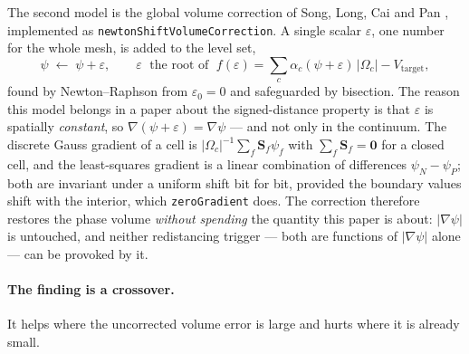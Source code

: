\documentclass[preprint,3p,11pt]{elsarticle}
\newcommand{\psilev}{\psi}
\newcommand{\gradpsi}{\lvert\nabla\psilev\rvert}
\begin{document}
The second model is the global volume correction of Song, Long, Cai and Pan
\cite{song2025}, implemented as \texttt{newtonShiftVolumeCorrection}. A single
scalar $\varepsilon$, one number for the whole mesh, is added to the level set,
\begin{equation}
  \psilev \;\leftarrow\; \psilev + \varepsilon,
  \qquad
  \varepsilon \;\text{ the root of }\;
  f(\varepsilon) = \sum_c \alpha_c(\psilev + \varepsilon)\,|\Omega_c| - V_{\text{target}},
  \label{eq:newtonshift}
\end{equation}
found by Newton--Raphson from $\varepsilon_0 = 0$ and safeguarded by bisection.
The reason this model belongs in a paper about the signed-distance property is
that $\varepsilon$ is spatially \emph{constant}, so
$\nabla(\psilev + \varepsilon) = \nabla\psilev$ --- and not only in the
continuum. The discrete Gauss gradient of a cell is
$|\Omega_c|^{-1}\sum_f \mathbf{S}_f\psilev_f$ with $\sum_f \mathbf{S}_f =
\mathbf{0}$ for a closed cell, and the least-squares gradient is a linear
combination of differences $\psilev_N - \psilev_P$; both are invariant under a
uniform shift bit for bit, provided the boundary values shift with the interior,
which \texttt{zeroGradient} does. The correction therefore restores the phase
volume \emph{without spending} the quantity this paper is about: $\gradpsi$ is
untouched, and neither redistancing trigger --- both are functions of $\gradpsi$
alone --- can be provoked by it.

\paragraph{The finding is a crossover.} It helps where the uncorrected volume
error is large and hurts where it is already small.
\end{document}
